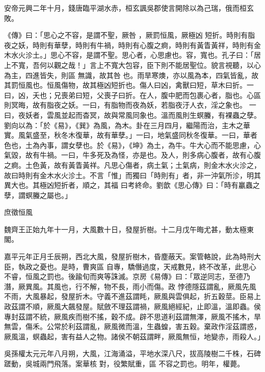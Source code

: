 \begin{pinyinscope}
 安帝元興二年十月，錢唐臨平湖水赤，桓玄諷吳郡使言開除以為己瑞，俄而桓玄敗。


《傳》曰：「思心之不容，是謂不聖，厥咎
 ，厥罰恒風，厥極凶
 短折。時則有脂夜之妖，時則有華孽，時則有牛禍，時則有心腹之痾，時則有黃眚黃祥，時則有金木水火沴土。」思心不容，是謂不聖。思心者，心思慮也。容，寬也。孔子曰：「居上不寬，吾何以觀之哉！」言上不寬大包容，臣下則不能居聖位。貌言視聽，以心為主，四進皆失，則區
 無識，故其咎
 也。雨旱寒燠，亦以風為本，四氣皆亂，故其罰恒風也。恒風傷物，故其極凶短折也。傷人曰凶，禽獸曰短，草木曰折。一曰，凶，夭也；兄喪弟曰短，父喪子曰折。在人，腹中肥而包裹心者，脂也。心區
 則冥晦，故有脂夜之妖。一曰，有脂物而夜為妖，若脂夜汙人衣，淫之象也。
 一曰，夜妖者，雲風並起而杳冥，故與常風同象也。溫而風則生螟螣，有裸蟲之孽。劉向以為：「於《易》，《巽》為風，為木。卦在三月四月，繼陽而治，主木之華實。風氣盛至，秋冬木復華，故有華孽。」一曰，地氣盛同秋冬復華。一曰，華者色也，土為內事，謂女孽也。於《易》，《坤》為土，為牛。牛大心而不能思慮，心氣毀，故有牛禍。一曰，牛多死及為怪，亦是也。及人，則多病心腹者，故有心腹之痾。土色黃，故有黃眚黃祥。凡思心傷者，病土氣；土氣病，則金木水火沴之，故曰時則有金木水火沴土。不言「惟」而獨曰「時則有」者，非一沖氣所沴，明其異大也。其極凶短折者，順之，其福
 曰考終命。劉歆《思心傳》曰：「時有臝蟲之孽，謂螟螣之屬也。」



 庶徵恒風



 魏齊王正始九年十一月，大風數十日，發屋折樹。十二月戊午晦尤甚，動太極東閣。


嘉平元年正月壬辰朔，西北大風，發屋折樹木，昏塵蔽天。案管輅說，此為時刑大臣，執政之憂也。是時，曹爽區
 自專，驕僭過度，天戒數見，終不改革，此思心不睿，恒風之罰也。後踰旬而爽等誅滅。京房《易傳》曰：「眾逆同志，至德乃潛，厥異風。其風也，行不解，物不長，雨小而傷。政
 悖德隱茲謂亂，厥風先風不雨，大風暴起，發屋折木。守義不進茲謂眊，厥風與雲俱起，折五穀莖。臣易上政茲謂不順，厥風大飆發屋。賦斂不理茲謂禍，厥風絕經紀，止即溫，溫即蟲。侯專封茲謂不統，厥風疾而樹不搖，穀不成。辟不思道利茲謂無澤，厥風不搖木，旱無雲，傷禾。公常於利茲謂亂，厥風微而溫，生蟲蝗，害五穀。棄政作淫茲謂惑，厥風溫，螟蟲起，害有益人之物。諸侯不朝茲謂畔，厥風無恒，地變赤，雨殺人。」


吳孫權太元元年八月朔，大風，江海涌溢，平地水深八尺，拔高陵樹二千株，石碑蹉動，吳城兩門飛落。案華核
 對，役繁賦重，區
 不容之罰也。明年，權薨。




\end{pinyinscope}
